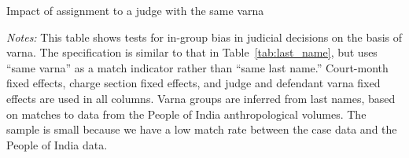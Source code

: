 \documentclass[12pt,english]{article}
\newcommand{\HOME}{\string~}
\newcommand{\curpath}{\HOME/ddl/justice-overleaf}
\newcommand{\curpath}{.}
\begin{document}
\begin{appendices}
\clearpage
\newpage

\begin{table}[h!]
  \begin{center}
    \vspace{-8mm}
  \caption{Impact of assignment to a judge with the same varna}  
      \label{tab:caste_poi}
  \resizebox{\textwidth}{!}{%
    
    }
    \end{center}
  \begin{center}\begin{minipage}{1.0\textwidth}
      \scriptsize
\vspace{-2mm}
      \emph{Notes:} 
      This table shows tests for in-group bias in judicial decisions on the basis of varna. The specification is similar to that in Table~\ref{tab:last_name}, but uses ``same varna'' as a match indicator rather than ``same last name.'' Court-month fixed effects, charge section fixed effects, and judge and defendant varna fixed effects are used in all columns. Varna groups are inferred from last names, based on matches to data from the People of India anthropological volumes. The sample is small because we have a low match rate between the case data and the People of India data. \par
    \end{minipage}
  \end{center}
\end{table}

  

\end{appendices}
\end{document}
